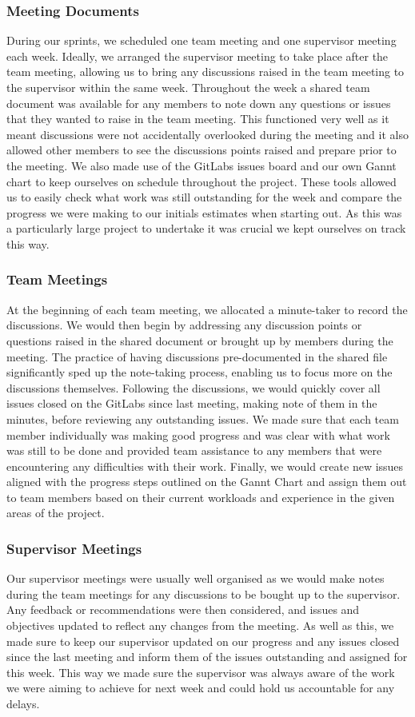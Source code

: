 \documentclass{article}
\begin{document}
    \subsubsection{Meeting Documents}
    During our sprints, we scheduled one team meeting and one supervisor meeting each week. Ideally, we arranged the supervisor meeting to take place after the team meeting, allowing us to bring any discussions raised in the team meeting to the supervisor within the same week.
    Throughout the week a shared team document was available for any members to note down any questions or issues that they wanted to raise in the team meeting. This functioned very well as it meant discussions were not accidentally overlooked during the meeting and it also allowed other members to see the discussions points raised and prepare prior to the meeting.
    We also made use of the GitLabs issues board and our own Gannt chart to keep ourselves on schedule throughout the project. These tools allowed us to easily check what work was still outstanding for the week and compare the progress we were making to our initials estimates when starting out. As this was a particularly large project to undertake it was crucial we kept ourselves on track this way.
    \subsubsection{Team Meetings}
    At the beginning of each team meeting, we allocated a minute-taker to record the discussions. We would then begin by addressing any discussion points or questions raised in the shared document or brought up by members during the meeting. The practice of having discussions pre-documented in the shared file significantly sped up the note-taking process, enabling us to focus more on the discussions themselves. 
    Following the discussions, we would quickly cover all issues closed on the GitLabs since last meeting, making note of them in the minutes, before reviewing any outstanding issues. We made sure that each team member individually was making good progress and was clear with what work was still to be done and provided team assistance to any members that were encountering any difficulties with their work.
    Finally, we would create new issues aligned with the progress steps outlined on the Gannt Chart and assign them out to team members based on their current workloads and experience in the given areas of the project.
    \subsubsection{Supervisor Meetings}
    Our supervisor meetings were usually well organised as we would make notes during the team meetings for any discussions to be bought up to the supervisor. Any feedback or recommendations were then considered, and issues and objectives updated to reflect any changes from the meeting.
    As well as this, we made sure to keep our supervisor updated on our progress and any issues closed since the last meeting and inform them of the issues outstanding and assigned for this week. This way we made sure the supervisor was always aware of the work we were aiming to achieve for next week and could hold us accountable for any delays.
\end{document}
